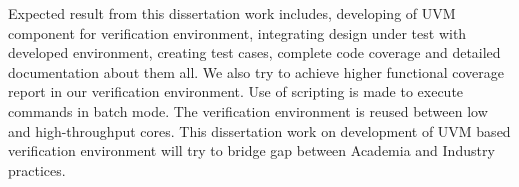 \thispagestyle{plain}

Expected result from this dissertation work includes, developing of UVM component for verification environment, integrating design under test with developed environment, creating test cases, complete code coverage and detailed documentation about them all. We also try to achieve higher functional coverage report in our verification environment. Use of scripting is made to execute commands in batch mode. The verification environment is reused between low and high-throughput cores. This dissertation work on development of UVM based verification environment will try to bridge gap between Academia and Industry practices.